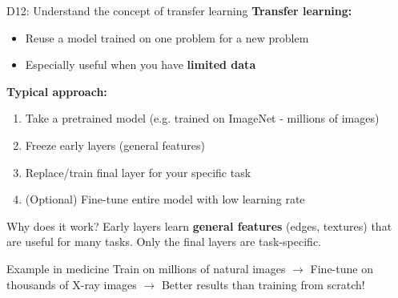 \documentclass[aspectratio=169, 10pt]{beamer}
\begin{document}
\begin{frame}{D12: Understand the concept of transfer learning}
    \textbf{Transfer learning:}
    \begin{itemize}
        \item Reuse a model trained on one problem for a new problem
        \item Especially useful when you have \textbf{limited data}
    \end{itemize}
    
    \vspace{0.3cm}
    \textbf{Typical approach:}
    \begin{enumerate}
        \item Take a pretrained model (e.g. trained on ImageNet - millions of images)
        \item Freeze early layers (general features)
        \item Replace/train final layer for your specific task
        \item (Optional) Fine-tune entire model with low learning rate
    \end{enumerate}
    
    \vspace{0.3cm}
    \begin{alertblock}{\footnotesize Why does it work?}
        \footnotesize Early layers learn \textbf{general features} (edges, textures) that are useful for many tasks. Only the final layers are task-specific.
    \end{alertblock}

    \begin{block}{\footnotesize Example in medicine}
        \footnotesize Train on millions of natural images $\rightarrow$ Fine-tune on thousands of X-ray images $\rightarrow$ Better results than training from scratch!
    \end{block}
\end{frame}
\end{document}
